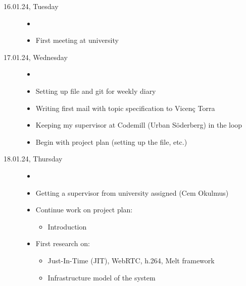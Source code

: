 \documentclass[a4, 11pt]{scrartcl}
\begin{document}
	\begin{description}
		








		\item[16.01.24, Tuesday] 
		
		\begin{itemize}
			\item[]
			\item First meeting at university
		\end{itemize}








		\item[17.01.24, Wednesday]
		
		\begin{itemize}
			\item[]
			\item Setting up file and git for weekly diary
			\item Writing first mail with topic specification to Vicen\c{c} Torra
			\item Keeping my supervisor at Codemill (Urban Söderberg) in the loop
			\item Begin with project plan (setting up the file, etc.)
		\end{itemize}








		\item[18.01.24, Thursday]
		
		\begin{itemize}
			\item[]
			\item Getting a supervisor from university assigned (Cem Okulmus) %
			\item Continue work on project plan:
			\begin{itemize}
				\item Introduction
			\end{itemize}
			
			\item First research on:
			\begin{itemize}
				\item Just-In-Time (JIT), WebRTC, h.264, Melt framework
				\item Infrastructure model of the system
			\end{itemize}
		\end{itemize}








\end{description}
\end{document}
